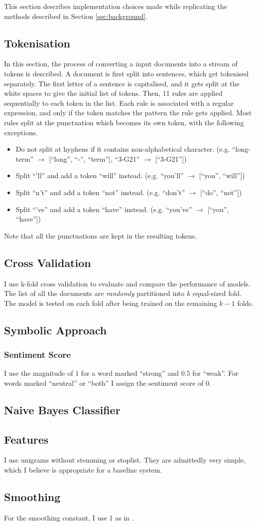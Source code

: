 This section describes implementation choices made while replicating the methods described in Section \ref{sec:background}.
\subsection{Tokenisation}
In this section, the process of converting a input documents into a stream of tokens is described.
A document is first split into sentences, which get tokenised separately.
The first letter of a sentence is capitalised, and it gets split at the white spaces to give the initial list of tokens.
Then, 11 rules are applied sequentially to each token in the list. Each rule is associated with a regular expression, and only if the token matches the pattern the rule gets applied. Most rules split at the punctuation which becomes its own token, with the following exceptions.
\begin{itemize}
\item Do not split at hyphens if it contains non-alphabetical character.
(e.g. ``long-term'' $\rightarrow$ [``long'', ``-'', ``term''], ``3-G21'' $\rightarrow$ [``3-G21''])
\item Split ``'ll'' and add a token ``will'' instead.
(e.g. ``you'll'' $\rightarrow$ [``you'', ``will''])
\item Split ``n't'' and add a token ``not'' instead.
(e.g. ``don't'' $\rightarrow$ [``do'', ``not''])
\item Split ``'ve'' and add a token ``have'' instead.
(e.g. ``you've'' $\rightarrow$ [``you'', ``have''])
\end{itemize}
Note that all the punctuations are kept in the resulting tokens.
\subsection{Cross Validation}
I use k-fold cross validation to evaluate and compare the performance of models.
The list of all the documents are {\em randomly} partitioned into $k$ equal-sized fold.
The model is tested on each fold after being trained on the remaining $k-1$ folds.
\subsection{Symbolic Approach}
\subsubsection{Sentiment Score}
I use the magnitude of $1$ for a word marked ``strong'' and $0.5$ for ``weak''. For words marked ``neutral'' or ``both'' I assign the sentiment score of $0$.
\subsection{Naive Bayes Classifier}
\subsection{Features}
I use unigrams without stemming or stoplist.
They are admittedly very simple, which I believe is appropriate for a baseline system.
\subsection{Smoothing}
For the smoothing constant, I use 1 as in \cite{pang2002thumbs}.